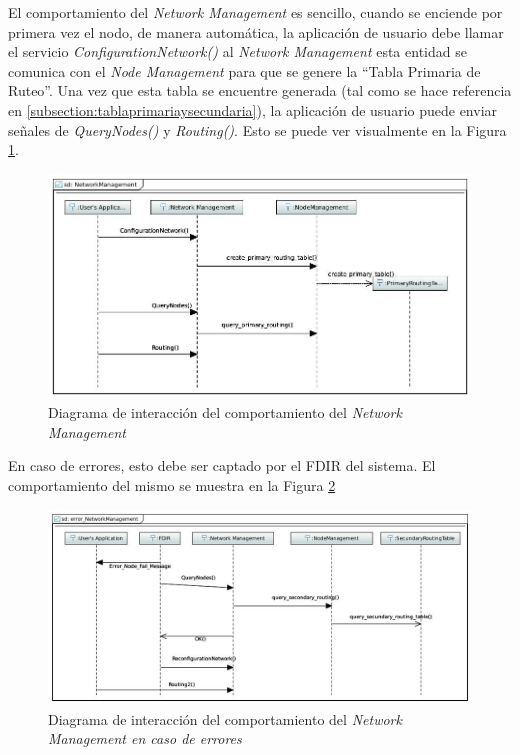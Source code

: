 El comportamiento del \textit{Network Management} es sencillo, cuando se
enciende por primera vez el nodo, de manera automática, la aplicación de
usuario debe llamar el servicio \textit{ConfigurationNetwork()} al \textit{
  Network Management} esta entidad se comunica con el \textit{Node Management}
para que se genere la ``Tabla Primaria de Ruteo''. Una vez que esta
tabla se encuentre generada (tal como se hace referencia en
\ref{subsection:tablaprimariaysecundaria}), la aplicación de usuario puede enviar señales
de \textit{QueryNodes()} y \textit{Routing()}. Esto se puede ver visualmente en
la Figura \ref{fig:NetworkManagementInteration}.

\begin{figure}[h!]
 \centering
 \includegraphics[scale=0.4]{images/Secciones/AppendixA/NewtworkManagement.JPG}
 \caption{Diagrama de interacción del comportamiento del \textit{Network
 Management}}
\label{fig:NetworkManagementInteration}
\end{figure}

En caso de errores, esto debe ser captado por el \ac{FDIR} del sistema. El
comportamiento del mismo se muestra en la Figura
\ref{fig:NetworkManagementInterationError}

\begin{figure}[h!]
 \centering
 \includegraphics[scale=0.4]{images/Secciones/AppendixA/errorNetworkmanagement.JPG}
 \caption{Diagrama de interacción del comportamiento del \textit{Network
     Management en caso de errores}}
\label{fig:NetworkManagementInterationError}
\end{figure}

